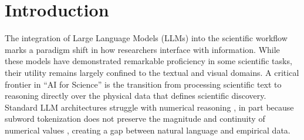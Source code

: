 %
%
%
%

\section{Introduction}\label{sec:intro}
The integration of Large Language Models (LLMs) into the scientific workflow marks a
paradigm shift in how researchers interface with information. While these models have
demonstrated remarkable proficiency in some scientific tasks, their utility remains
largely confined to the textual and visual domains. A critical frontier in ``AI for
Science'' is the transition from processing scientific text to reasoning directly over
the physical data that defines scientific discovery. Standard LLM
architectures struggle with numerical reasoning \citep{Rahman2025}, in part because
subword tokenization does not preserve the magnitude and continuity of numerical values
\citep{Golkar2023_xval}, creating a gap between natural language and empirical data.

